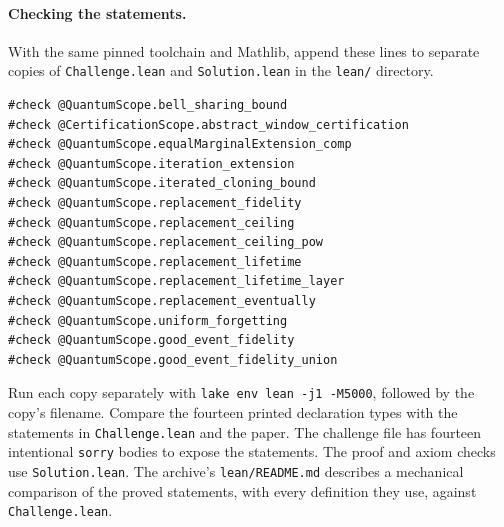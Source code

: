 \paragraph{Checking the statements.}
With the same pinned toolchain and Mathlib, append these lines to
separate copies of \texttt{Challenge.lean} and \texttt{Solution.lean}
in the \texttt{lean/} directory.
\begin{verbatim}
#check @QuantumScope.bell_sharing_bound
#check @CertificationScope.abstract_window_certification
#check @QuantumScope.equalMarginalExtension_comp
#check @QuantumScope.iteration_extension
#check @QuantumScope.iterated_cloning_bound
#check @QuantumScope.replacement_fidelity
#check @QuantumScope.replacement_ceiling
#check @QuantumScope.replacement_ceiling_pow
#check @QuantumScope.replacement_lifetime
#check @QuantumScope.replacement_lifetime_layer
#check @QuantumScope.replacement_eventually
#check @QuantumScope.uniform_forgetting
#check @QuantumScope.good_event_fidelity
#check @QuantumScope.good_event_fidelity_union
\end{verbatim}
Run each copy separately with \texttt{lake env lean -j1 -M5000},
followed by the copy's filename. Compare the fourteen printed declaration
types with the statements in \texttt{Challenge.lean} and the paper.
The challenge file has fourteen intentional \texttt{sorry} bodies to expose
the statements. The proof and axiom checks use \texttt{Solution.lean}. The archive's \texttt{lean/README.md} describes a mechanical comparison of the proved statements, with every definition they use, against \texttt{Challenge.lean}.

